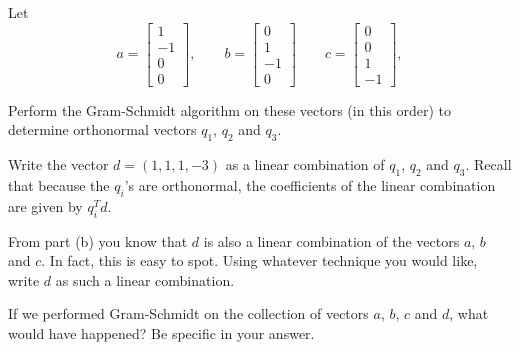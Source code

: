 \documentclass[minion]{homework}
\def\vecfour#1#2#3#4{\begin{bmatrix}#1\\#2\\#3\\#4\end{bmatrix}}
\begin{document}
\begin{problems}
    \problem Let
    \[
        a= \vecfour1{-1}00,\qquad b=\vecfour0{1}{-1}0
        \qquad c = \vecfour001{-1},
    \]
    \begin{subproblems}
    \item 
        Perform the Gram-Schmidt algorithm on these vectors (in this order) 
        to determine orthonormal 
    vectors $q_1$, $q_2$ and $q_3$.
    \item Write the vector $d = (1,1,1,-3)$ as a linear combination of $q_1$, $q_2$
    and $q_3$.  Recall that because the $q_i$'s are orthonormal, the coefficients
    of the linear combination are given by $q_i^T d$.
    \item From part (b) you know that $d$ is also a linear combination of 
    the vectors $a$, $b$ and $c$.  In fact, this is easy to spot.  Using
    whatever technique you would like, write $d$ as such a linear combination.
    \item If we performed Gram-Schmidt on the collection of vectors $a$, $b$, $c$ and $d$,
    what would have happened? Be specific in your answer.
    \end{subproblems}
\end{problems}
\end{document}
